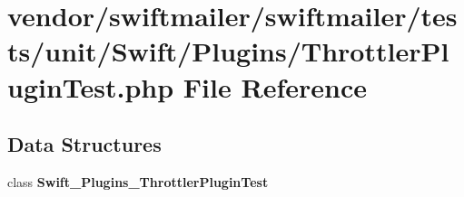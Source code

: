 \section{vendor/swiftmailer/swiftmailer/tests/unit/\+Swift/\+Plugins/\+Throttler\+Plugin\+Test.php File Reference}
\label{_throttler_plugin_test_8php}
\subsection*{Data Structures}
\begin{DoxyCompactItemize}
\item 
class {\bf Swift\+\_\+\+Plugins\+\_\+\+Throttler\+Plugin\+Test}
\end{DoxyCompactItemize}

